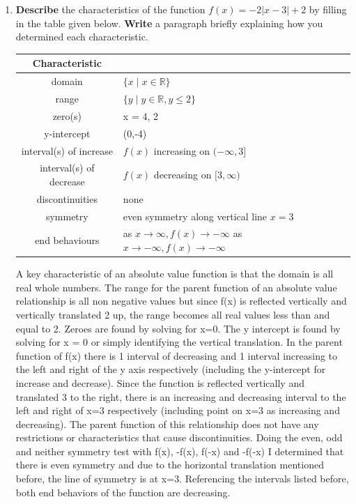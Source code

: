 \documentclass[12pt]{book}
\begin{document}

\begin{enumerate}

\item  \textbf{Describe} the characteristics of the function $f(x) = -2|x-3|+2$ by filling in the table given below. \textbf{Write} a paragraph briefly explaining how you determined each characteristic.\\

\vspace{0.3 cm}

\renewcommand{\arraystretch}{3}  %
\begin{center}

\begin{tabular}{|c|m{4in}|}
\hline
\textbf{Characteristic} &  \\
\hline
domain & $\{ x \mid x \in \mathbb{R} \}$\\
\hline
range & $\{ y \mid y \in \mathbb{R}, y \leq 2 \}$\\
\hline
zero(s) & x = 4, 2\\
\hline
y-intercept & (0,-4)\\
\hline
interval(s) of increase & $f(x)$ increasing on $(-\infty, 3]$\\
\hline
interval(s) of decrease & $f(x)$ decreasing on $[3, \infty)$\\
\hline
discontinuities & none\\
\hline
symmetry & even symmetry along vertical line $x=3$\\
\hline
end behaviours & \shortstack[l]{as $x \to \infty, f(x) \to -\infty$ \\ as $x \to -\infty, f(x) \to -\infty$}\\
\hline
\end{tabular}
\end{center}

A key characteristic of an absolute value function is that the domain is all
 real whole numbers. The range for the parent function of an absolute
value relationship is all non negative values but since f(x)
is reflected vertically and vertically translated 2 up, the range becomes all
real values less than and equal to 2. Zeroes are found by solving for x=0.
The y intercept is found by solving for x = 0 or simply identifying the vertical translation.
In the parent function of f(x) there is 1 interval of decreasing and 1 interval increasing to 
the left and right of the y axis respectively (including the y-intercept for increase and decrease).
 Since the function is reflected vertically and translated 3 to the right, there is an increasing and decreasing interval to the
left and right of x=3 respectively (including point on x=3 as increasing and decreasing). 
The parent function of this relationship does not have any restrictions or characteristics
that cause discontinuities. Doing the even, odd and neither symmetry test with f(x), -f(x), f(-x) and -f(-x)
I determined that there is even symmetry and due to the horizontal translation mentioned before, the line
of symmetry is at x=3. Referencing the intervals listed before, both end behaviors of the function are decreasing.


\end{enumerate}
\end{document}
